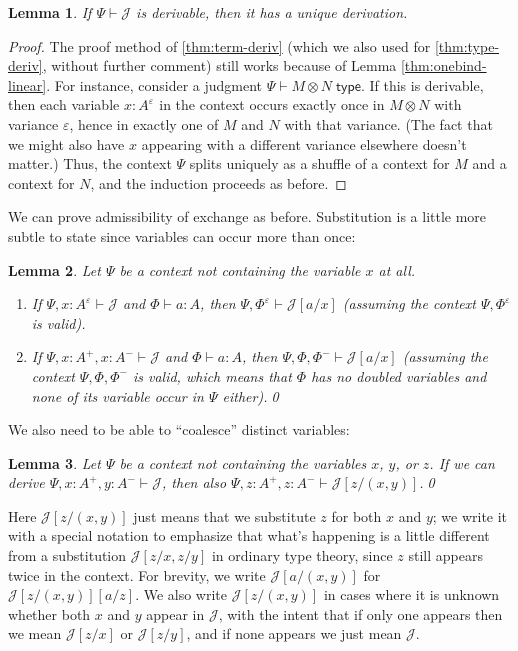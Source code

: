 \documentclass{amsart}
\let\types\vdash %
\def\p{^+} %
\def\m{^-}
\newcommand{\e}[1]{^{\varepsilon_{#1}}}
\newcommand{\ep}{\varepsilon}
\newcommand{\cJ}{\ensuremath{\mathcal{J}}}
\def\type{\;\mathsf{type}}
\newtheorem{lem}{Lemma}
\theoremstyle{definition}
\begin{document}
\begin{lem}
  If $\Psi\types \cJ$ is derivable, then it has a unique derivation.
\end{lem}
\begin{proof}
  The proof method of \cref{thm:term-deriv} (which we also used for \cref{thm:type-deriv}, without further comment) still works because of Lemma \ref{thm:onebind-linear}.
  For instance, consider a judgment $\Psi\types M\otimes N \type$.
  If this is derivable, then each variable $x:A\e{}$ in the context occurs exactly once in $M\otimes N$ with variance $\ep$, hence in exactly one of $M$ and $N$ with that variance.
  (The fact that we might also have $x$ appearing with a different variance elsewhere doesn't matter.)
  Thus, the context $\Psi$ splits uniquely as a shuffle of a context for $M$ and a context for $N$, and the induction proceeds as before.
\end{proof}

We can prove admissibility of exchange as before.
Substitution is a little more subtle to state since variables can occur more than once:

\begin{lem}
  Let $\Psi$ be a context not containing the variable $x$ at all.
  \begin{enumerate}
  \item If $\Psi,x:A\e{} \types \cJ$ and $\Phi \types a:A$, then $\Psi,\Phi\e{} \types \cJ[a/x]$ (assuming the context $\Psi,\Phi\e{}$ is valid).
  \item If $\Psi,x:A\p,x:A\m \types \cJ$ and $\Phi \types a:A$, then $\Psi,\Phi,\Phi\m \types \cJ[a/x]$ (assuming the context $\Psi,\Phi,\Phi\m$ is valid, which means that $\Phi$ has no doubled variables and none of its variable occur in $\Psi$ either).\qed
  \end{enumerate}
\end{lem}

We also need to be able to ``coalesce'' distinct variables:

\begin{lem}
  Let $\Psi$ be a context not containing the variables $x$, $y$, or $z$.
  If we can derive $\Psi,x:A\p,y:A\m \types \cJ$, then also $\Psi,z:A\p,z:A\m \types \cJ[z/(x,y)]$.\qed
\end{lem}

Here $\cJ[z/(x,y)]$ just means that we substitute $z$ for both $x$ and $y$; we write it with a special notation to emphasize that what's happening is a little different from a substitution $\cJ[z/x,z/y]$ in ordinary type theory, since $z$ still appears twice in the context.
For brevity, we write $\cJ[a/(x,y)]$ for $\cJ[z/(x,y)][a/z]$.
We also write $\cJ[z/(x,y)]$ in cases where it is unknown whether both $x$ and $y$ appear in $\cJ$, with the intent that if only one appears then we mean $\cJ[z/x]$ or $\cJ[z/y]$, and if none appears we just mean \cJ.
\end{document}
